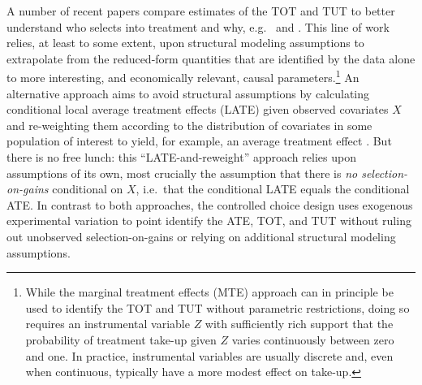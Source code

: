 \documentclass[12pt, a4paper]{article}
\begin{document}
A number of recent papers compare estimates of the TOT and TUT to better understand who selects into treatment and why, e.g.\ \cite{cornelissen2018benefits} and \cite{Walters}. 
This line of work relies, at least to some extent, upon structural modeling assumptions to extrapolate from the reduced-form quantities that are identified by the data alone to more interesting, and economically relevant, causal parameters.\footnote{While the marginal treatment effects (MTE) approach \citep{heckman2007econometric} can in principle be used to identify the TOT and TUT without parametric restrictions, doing so requires an instrumental variable $Z$ with sufficiently rich support that the probability of treatment take-up given $Z$ varies continuously between zero and one. In practice, instrumental variables are usually discrete and, even when continuous, typically have a more modest effect on take-up.} 
An alternative approach aims to avoid structural assumptions by calculating conditional local average treatment effects (LATE) given observed covariates $X$ and re-weighting them according to the distribution of covariates in some population of interest to yield, for example, an average treatment effect \citep{aronow2013beyond,angrist2013extrapolate}. 
But there is no free lunch: this ``LATE-and-reweight'' approach relies upon assumptions of its own, most crucially the assumption that there is \emph{no selection-on-gains} conditional on $X$, i.e.\ that the conditional LATE equals the conditional ATE. 
In contrast to both approaches, the controlled choice design uses exogenous experimental variation to point identify the ATE, TOT, and TUT without ruling out unobserved selection-on-gains or relying on additional structural modeling assumptions.
\end{document}
